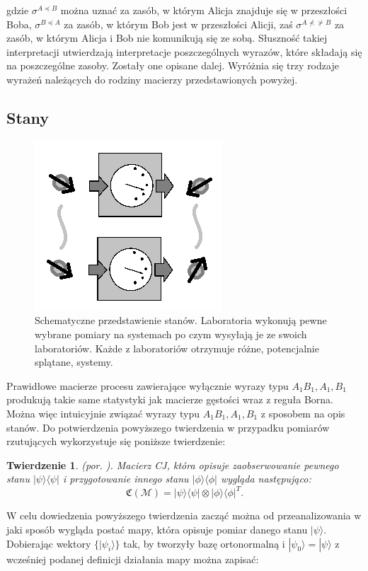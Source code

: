 \documentclass[10pt]{article} %
\newtheorem{tw}{Twierdzenie}
\newcommand{\Ket}[1]{|#1\rangle}
\newcommand{\Bra}[1]{\langle#1|}
\newcommand{\KP}{\Ket{\psi}}
\newcommand{\BP}{\Bra{\psi}}
\newcommand{\MCJ}{\mathfrak{C}}
\begin{document}
gdzie $\sigma^{A \preceq B}$ można uznać za zasób, w którym Alicja znajduje się w przeszłości Boba, $\sigma^{B \preceq A}$ za zasób, w którym Bob jest w przeszłości Alicji, zaś $\sigma^{A \nprec \nsucc B}$ za zasób, w którym Alicja i Bob nie komunikują się ze sobą. Słuszność takiej interpretacji utwierdzają interpretacje poszczególnych wyrazów, które składają się na poszczególne zasoby. Zostały one opisane dalej.
Wyróżnia się trzy rodzaje wyrażeń należących do rodziny macierzy przedstawionych powyżej.
\subsection{Stany}
\begin{figure}[h]
\centering
\includegraphics{obrazki/states_new}
\caption{Schematyczne przedstawienie stanów. Laboratoria wykonują pewne wybrane pomiary na systemach po czym wysyłają je ze swoich laboratoriów. Każde z laboratoriów otrzymuje różne, potencjalnie splątane, systemy.}
\end{figure}
Prawidłowe macierze procesu zawierające wyłącznie wyrazy typu $A_1 B_1, A_1, B_1$ produkują takie same statystyki jak macierze gęstości wraz z reguła Borna. 
Można więc intuicyjnie związać wyrazy typu $A_1 B_1, A_1, B_1$ z sposobem na opis stanów.
Do potwierdzenia powyższego twierdzenia w przypadku pomiarów rzutujących wykorzystuje się poniższe twierdzenie:
\begin{tw}
(por. \cite{process_matrix}).
Macierz CJ, która opisuje zaobserwowanie pewnego stanu $\KP\BP$ i przygotowanie innego stanu $\Ket{\phi}\Bra{\phi}$ wygląda następująco:
\begin{equation}
\MCJ(\mathcal{M}) = \KP\BP \otimes \Ket{\phi}\Bra{\phi}^T.
\end{equation}
\end{tw}
W celu dowiedzenia powyższego twierdzenia zacząć można od przeanalizowania w jaki sposób wygląda postać mapy, która opisuje pomiar danego stanu $\Ket{\psi}$. Dobierając wektory $\{ \Ket{\psi_i} \}$ tak, by tworzyły bazę ortonormalną i $\Ket{\psi_0} = \Ket{\psi}$ z wcześniej podanej definicji działania mapy można zapisać:
\end{document}
